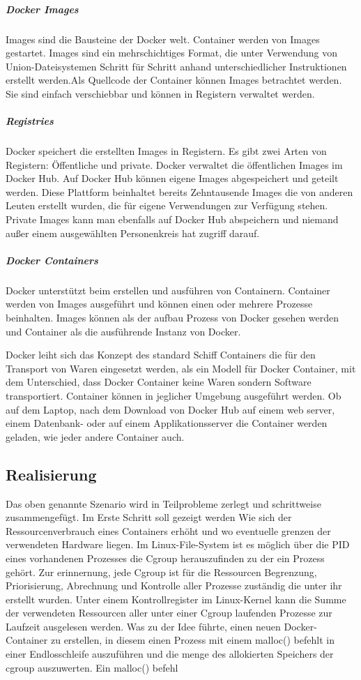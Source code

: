 \subparagraph{Docker Images}
Images sind die Bausteine der Docker welt. Container werden von Images gestartet. Images sind ein mehrschichtiges Format, die unter Verwendung von Union-Dateisystemen Schritt für Schritt anhand unterschiedlicher Instruktionen erstellt werden.Als Quellcode der Container können Images betrachtet werden. Sie sind einfach verschiebbar und können in Registern verwaltet werden.

\subparagraph{Registries}
Docker speichert die erstellten Images in Registern. Es gibt zwei Arten von Registern: Öffentliche und private. Docker verwaltet die öffentlichen Images im Docker Hub\cite{DockerInc.2016DockerHub}. Auf Docker Hub können eigene Images abgespeichert und geteilt werden. Diese Plattform beinhaltet bereits Zehntausende Images die von anderen Leuten erstellt wurden, die für eigene Verwendungen zur Verfügung stehen. Private Images kann man ebenfalls auf Docker Hub abspeichern und niemand außer einem ausgewählten Personenkreis hat zugriff darauf.

\subparagraph{Docker Containers}
Docker unterstützt beim erstellen und ausführen von Containern. Container werden von Images ausgeführt und können einen oder mehrere Prozesse beinhalten. Images können als der aufbau Prozess von Docker gesehen werden und Container als die ausführende Instanz von Docker.

Docker leiht sich das Konzept des standard Schiff Containers die für den Transport von Waren eingesetzt werden, als ein Modell für Docker Container, mit dem Unterschied, dass Docker Container keine Waren sondern Software transportiert. Container können in jeglicher Umgebung ausgeführt werden. Ob auf dem Laptop, nach dem Download von Docker Hub auf einem web server, einem Datenbank- oder auf einem Applikationsserver die Container werden geladen, wie jeder andere Container auch.

\pagebreak

\subsection{Realisierung}
Das oben genannte Szenario wird in Teilprobleme zerlegt und schrittweise zusammengefügt. Im Erste Schritt soll gezeigt werden Wie sich der Ressourcenverbrauch eines Containers erhöht und wo eventuelle grenzen der verwendeten Hardware liegen. Im Linux-File-System ist es möglich über die PID eines vorhandenen Prozesses die Cgroup herauszufinden zu der ein Prozess gehört. Zur erinnernung, jede Cgroup ist für die Ressourcen Begrenzung, Priorisierung, Abrechnung und Kontrolle aller Prozesse zuständig die unter ihr erstellt wurden. Unter einem Kontrollregister im Linux-Kernel kann die Summe der verwendeten Ressourcen aller unter einer Cgroup laufenden Prozesse zur Laufzeit ausgelesen werden. Was zu der Idee führte, einen neuen Docker-Container zu erstellen, in diesem einen Prozess mit einem malloc() befehlt in einer Endlosschleife auszuführen und die menge des allokierten Speichers der cgroup auszuwerten. Ein malloc() befehl 

